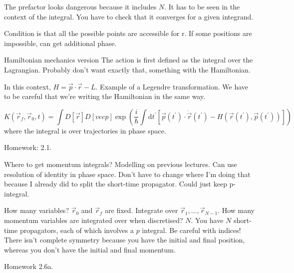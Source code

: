 \documentclass[a4paper]{extarticle}
\newcommand{\tpr}{t^\prime}
\newcommand{\dtpr}{\text{d}t^\prime}
\newcommand{\ihbar}{\frac{i}{\hbar}}
\newcommand{\propagator}{K(\vec{r}_f, \vec{r}_0, t)}
\begin{document}
The prefactor looks dangerous because it includes $N$.
It has to be seen in the context of the integral.
You have to check that it converges for a given integrand.

Condition is that all the possible points are accessible for r.
If some positions are impossible, can get additional phase.

Hamiltonian mechanics version
The action is first defined as the integral over the Lagrangian.
Probably don't want exactly that, something with the Hamiltonian.

In this context, $H = \vec{p}\cdot\vec{r} - L$.
Example of a Legendre transformation.
We have to be careful that we're writing the Hamiltonian in the same way.

\begin{equation}
  \propagator
  = \int D\left[\vec{r}\right] D\left[vec{p}\right]
  \exp\left(
  \ihbar \int \dtpr \left[
      \vec{p}(\tpr) \cdot \dot{\vec{r}}(\tpr) - H(\vec{r}(\tpr), \vec{p}(\tpr))
      \right]
  \right)
\end{equation}
where the integral is over trajectories in phase space.

Homework: 2.1.

Where to get momentum integrals? Modelling on previous lectures.
Can use resolution of identity in phase space.
Don't have to change where I'm doing that because I already did to split the
short-time propagator. Could just keep p-integral.

How many variables?
$\vec{r}_0$ and $\vec{r}_f$ are fixed.
Integrate over $\vec{r}_1, \dots, \vec{r}_{N - 1}$.
How many momentum variables are integrated over when discretised? $N$.
You have $N$ short-time propagators, each of which involves a $p$ integral.
Be careful with indices!
There isn't complete symmetry because you have the initial and final position,
whereas you don't have the initial and final momentum.

Homework 2.6a.
\end{document}
